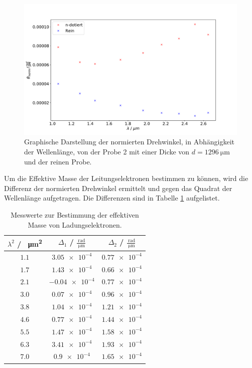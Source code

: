 \begin{figure}
  \centering
  \includegraphics[width = \textwidth,keepaspectratio]{figure/Theta2_plot.pdf}
  \caption{Graphische Darstellung der normierten Drehwinkel, in Abhängigkeit der Wellenlänge, von der Probe 2 mit einer Dicke von $d=\SI{1296}{\micro\meter}$ und 
  der reinen Probe.}
  \label{fig:Drehwinkel_2}
\end{figure}
\FloatBarrier
Um die  Effektive Masse der Leitungselektronen bestimmen zu können, wird die Differenz der normierten Drehwinkel ermittelt
und gegen das Quadrat der Wellenlänge aufgetragen. Die Differenzen sind in Tabelle \ref{tab:Differenzen} aufgelistet.
\FloatBarrier
\begin{table}
  \centering
  \begin{tabular}{c c c}
    \toprule
    $\lambda^2$ / \SI{}{\square\micro\meter}&$\Delta_{\text{1}}$ / $\frac{\SI{}{\radian}}{\SI{}{\micro\meter}}$&$\Delta_{\text{2}}$ / $\frac{\SI{}{\radian}}{\SI{}{\micro\meter}}$\\
    \midrule 
    $\num{1.1}$&$\num{3.05e-4}$&$ \num{0.77e-4}$\\
    $\num{1.7}$&$\num{1.43e-4}$&$ \num{0.66e-4}$\\
    $\num{2.1}$&$\num{-0.04e-4}$&$\num{0.77e-4}$\\
    $\num{3.0}$&$\num{0.07e-4}$&$ \num{0.96e-4}$\\
    $\num{3.8}$&$\num{1.04e-4}$&$ \num{1.21e-4}$\\
    $\num{4.6}$&$\num{0.77e-4}$&$ \num{1.44e-4}$\\
    $\num{5.5}$&$\num{1.47e-4}$&$ \num{1.58e-4}$\\
    $\num{6.3}$&$\num{3.41e-4}$&$ \num{1.93e-4}$\\
    $\num{7.0}$&$\num{0.9e-4}$&$  \num{1.65e-4}$\\
    \bottomrule
  \end{tabular}
  \caption{Messwerte zur Bestimmung der effektiven Masse von Ladungselektronen.}
  \label{tab:Differenzen}
\end{table}
